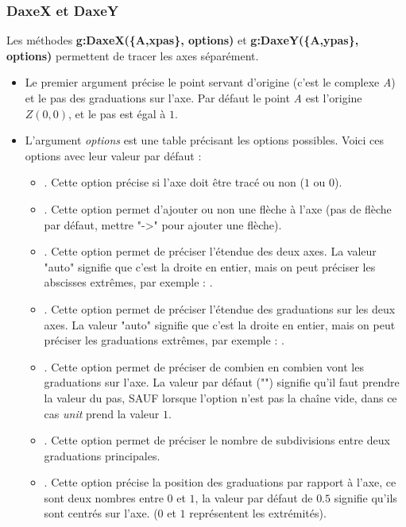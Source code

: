 \subsubsection{DaxeX et DaxeY}

Les méthodes \textbf{g:DaxeX(\{A,xpas\}, options)} et \textbf{g:DaxeY(\{A,ypas\}, options)} permettent de tracer les axes séparément.
\begin{itemize}
    \item Le premier argument précise le point servant d'origine (c'est le complexe \emph{A}) et le pas des graduations sur l'axe. Par défaut le point \emph{A} est l'origine $Z(0,0)$, et le pas est égal à $1$.
    \item L'argument \emph{options} est une table précisant les options possibles. Voici ces options avec leur valeur par défaut :
        \begin{itemize}
            \item {}. Cette option précise si l'axe doit être tracé ou non ($1$ ou $0$).
            \item {}. Cette option permet d'ajouter ou non une flèche à l'axe (pas de flèche par défaut, mettre "->" pour ajouter une flèche).
            \item {}. Cette option permet de préciser l'étendue des deux axes. La valeur "auto" signifie que c'est la droite en entier, mais on peut préciser les abscisses extrêmes, par exemple : .
            \item {}. Cette option permet de préciser l'étendue des graduations sur les deux axes. La valeur "auto" signifie que c'est la droite en entier, mais on peut préciser les graduations extrêmes, par exemple : .
            \item {}. Cette option permet de préciser de combien en combien vont les graduations sur l'axe. La valeur par défaut ("") signifie qu'il faut prendre la valeur du pas, SAUF lorsque l'option  n'est pas la chaîne vide, dans ce cas \emph{unit} prend la valeur $1$.
            \item {}. Cette option permet de préciser le nombre de subdivisions entre deux graduations principales.
            \item {}. Cette option précise la position des graduations par rapport à l'axe, ce sont deux nombres entre $0$ et $1$, la valeur par défaut de $0.5$ signifie qu'ils sont centrés sur l'axe. ($0$ et $1$ représentent les extrémités).

\end{itemize}
\end{itemize}
